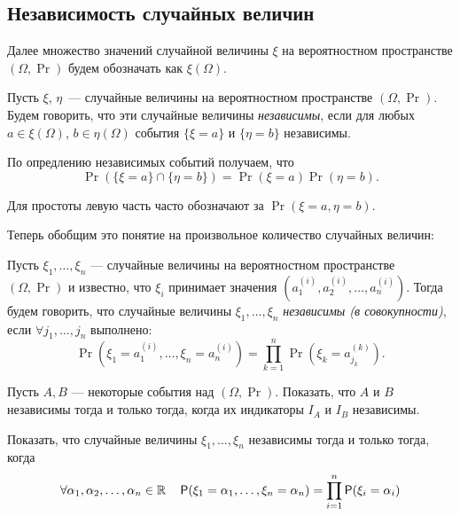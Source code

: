 \subsection{Независимость случайных величин}
Далее множество значений случайной величины \(\xi\) на вероятностном пространстве \((\Omega, \Pr)\) будем обозначать как \(\xi(\Omega)\).

\begin{definition}
    Пусть \(\xi\), \(\eta\)~--- случайные величины на вероятностном пространстве \((\Omega, \Pr)\). Будем говорить, что эти случайные величины \emph{независимы}, если для любых \(a \in \xi(\Omega)\), \(b \in \eta(\Omega)\) события \(\{\xi = a\}\) и \(\{\eta = b\}\) независимы.
\end{definition}
По опредлению независимых событий получаем, что
\[\Pr(\{\xi = a\} \cap \{\eta = b\}) = \Pr(\xi = a)\Pr(\eta = b).\]
\begin{remark}
    Для простоты левую часть часто обозначают за \(\Pr(\xi = a, \eta = b)\).
\end{remark}
Теперь обобщим это понятие на произвольное количество случайных величин:
\begin{definition}
    Пусть \(\xi_1, \ldots, \xi_n\) --- случайные величины на вероятностном пространстве \((\Omega, \Pr)\) и известно, что \(\xi_i\) принимает значения \((a_1^{(i)}, a_2^{(i)}, \ldots, a_n^{(i)})\). Тогда будем говорить, что случайные величины \(\xi_1, \ldots, \xi_n\) \emph{независимы (в совокупности)}, если \(\forall j_1, \ldots, j_n\) выполнено:
    \[\Pr(\xi_1 = a_1^{(i)}, \ldots, \xi_n = a_n^{(i)}) = \prod\limits_{k = 1}^{n}\Pr(\xi_k = a_{j_{k}}^{(k)}).\]
\end{definition}
\begin{exercise}
    Пусть \(A, B\) --- некоторые события над \((\Omega, \Pr)\). Показать, что \(A\) и \(B\) независимы тогда и только тогда, когда их индикаторы \(I_A\) и \(I_B\) независимы.
\end{exercise}
\begin{exercise}
    Показать, что случайные величины \(\xi_1, \ldots, \xi_n\) независимы тогда и только тогда, когда
    \[\forall \alpha_1, \alpha_2, \ldots, \alpha_n \in \mathbb{R} \quad \operatorname{\mathsf{P}}(\xi_1 = \alpha_1, \ldots, \xi_n = \alpha_n) = \prod\limits_{i = 1}^{n}\operatorname{\mathsf{P}}(\xi_i = \alpha_i)\]
\end{exercise}


